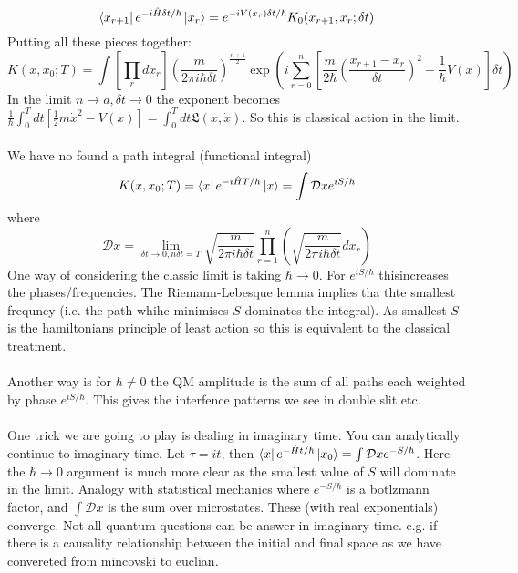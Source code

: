 \documentclass{article}
\begin{document}
$$
\bra{x_{r+1}} e^{-i \hat H \delta t/\hbar} \ket{x_r} = e^{-i V(x_r) \delta t/\hbar} K_0(x_{r+1}, x_r; \delta t)
$$
Putting all these pieces together:
\begin{equation}
        K(x,x_0;T) = \int [ \prod_r dx_r] (\frac{m}{2\pi i \hbar \delta t})^{\frac{n+1}{2}} \exp( i \sum_{r=0}^n [ \frac{m}{2\hbar}( \frac{x_{r+1} - x_r}{\delta t})^2  - \frac{1}{\hbar} V(x)] \delta t)
\end{equation}
In the limit $n\rightarrow a, \delta t \rightarrow 0$ the exponent becomes $\frac{1}{\hbar} \int_0^T dt [ \frac{1}{2} m \dot x^2 - V(x)] = \int_0^T dt \mathfrak{L}(x,\dot x)$. So this is classical action in the limit.\\\\
We have no found a path integral (functional integral)
$$
K(x, x_0; T) = \bra{x} e^{- i \hat H T /\hbar} \ket{x} = \int \mathcal{D}x e^{i S/\hbar}
$$
where $$\mathcal{D}x = \lim_{\delta t \rightarrow 0, n \delta t = T} \sqrt{\frac{m}{2 \pi i \hbar \delta t}} \prod_{r=1}^n ( \sqrt{\frac{m}{2 \pi i \hbar \delta t}} dx_r)$$
One way of considering the classic limit is taking $\hbar \rightarrow 0$. For $e^{iS/\hbar}$ thisincreases the phases/frequencies. The Riemann-Lebesque lemma implies tha thte smallest frequncy (i.e. the path whihc minimises $S$ dominates the integral). As smallest $S$ is the hamiltonians principle of least action so this is equivalent to the classical treatment. \\\\
Another way is for $\hbar \neq 0$ the QM amplitude is the sum of all paths each weighted by phase $e^{iS/\hbar}$. This gives the interfence patterns we see in double slit etc.\\\\
One trick we are going to play is dealing in imaginary time. You can analytically continue to imaginary time. Let $\tau = it$, then $\bra{x} e^{- \hat H t/\hbar} \ket{x_0} = \int \mathcal{D}x e^{-S/\hbar}$. Here the $\hbar \rightarrow 0$ argument is much more clear as the smallest value of $S$ will dominate in the limit. Analogy with statistical mechanics where $e^{-S /\hbar}$ is a botlzmann factor, and $\int \mathcal{D}x $ is the sum over microstates. These (with real exponentials) converge. Not all quantum questions can be answer in imaginary time. e.g. if there is a causality relationship between the initial and final space as we have convereted from mincovski to euclian. 
\end{document}
